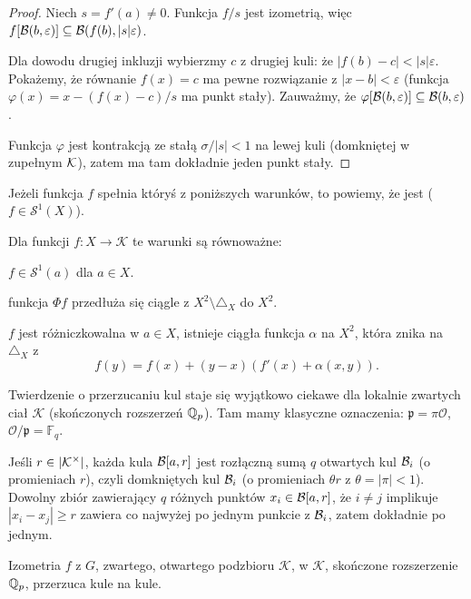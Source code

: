 \begin{proof}
	Niech $s = f'(a) \neq 0$.
	Funkcja $f / s$ jest izometrią, więc $f[\mathcal B(b, \varepsilon)] \subseteq \mathcal B(f(b), |s| \varepsilon)$.

	Dla dowodu drugiej inkluzji wybierzmy $c$ z drugiej kuli: że $|f(b) - c| < |s| \varepsilon$.
	Pokażemy, że równanie $f(x) = c$ ma pewne rozwiązanie z $|x - b| < \varepsilon$ (funkcja $\varphi(x) = x - (f(x) - c) / s$ ma punkt stały).
	Zauważmy, że $\varphi[\mathcal B(b, \varepsilon)] \subseteq \mathcal B(b, \varepsilon)$.

	Funkcja $\varphi$ jest kontrakcją ze stałą $\sigma/|s| < 1$ na lewej kuli (domkniętej w zupełnym $\mathcal K$), zatem ma tam dokładnie jeden punkt stały.
\end{proof}

Jeżeli funkcja $f$ spełnia któryś z poniższych warunków, to powiemy, że jest  ($f \in \mathcal S^1(X)$).

\begin{fakt}
	Dla funkcji $f \colon X \to \mathcal K$ te warunki są równoważne:
	\begin{enumx}
		\item $f \in \mathcal S^1(a)$ dla $a \in X$.
		\item funkcja $\Phi f$ przedłuża się ciągle z $X^2 \setminus \triangle_X$ do $X^2$.
		\item $f$ jest różniczkowalna w $a \in X$, istnieje ciągła funkcja $\alpha$ na $X^2$, która znika na $\triangle_X$ z
		\[
			f(y) = f(x) + (y-x) (f'(x) + \alpha(x,y)).
		\]
	\end{enumx}
\end{fakt}

Twierdzenie o przerzucaniu kul staje się wyjątkowo ciekawe dla lokalnie zwartych ciał $\mathcal K$ (skończonych rozszerzeń $\mathbb Q_p$).
Tam mamy klasyczne oznaczenia: $\mathfrak p = \pi \mathcal O$, $\mathcal O/\mathfrak p = \mathbb F_q$.

Jeśli $r \in |\mathcal K^\times|$, każda kula $\mathcal B[a, r]$ jest rozłączną sumą $q$ otwartych kul $\mathcal B_i$ (o promieniach $r$), czyli domkniętych kul $\mathcal B_i$ (o promieniach $\theta r$ z $\theta = |\pi| < 1$).
Dowolny zbiór zawierający $q$ różnych punktów $x_i \in \mathcal B[a, r]$, że $i \neq j$ implikuje $|x_i - x_j| \ge r$ zawiera co najwyżej po jednym punkcie z $\mathcal B_i$, zatem dokładnie po jednym.

\begin{fakt} \label{exinferius}
	Izometria $f$ z $G$, zwartego, otwartego podzbioru $\mathcal K$, w $\mathcal K$, skończone rozszerzenie $\mathbb Q_p$, przerzuca kule na kule.
\end{fakt}

